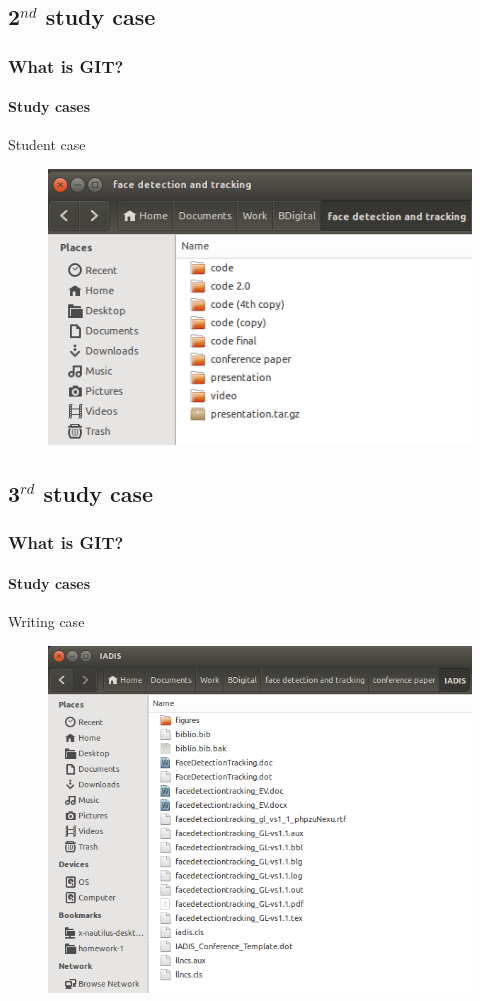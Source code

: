 \documentclass{beamer}
\begin{document}
\subsection{2$^{nd}$ study case}

\begin{frame}
  \frametitle{What is GIT?}
  \framesubtitle{Study cases}
  \begin{block}{Student case}
    \begin{figure}
      \centering
      \includegraphics[width=.7\textwidth]{./images/coding.png}
    \end{figure}
  \end{block}
\end{frame}

\subsection{3$^{rd}$ study case}

\begin{frame}
  \frametitle{What is GIT?}
  \framesubtitle{Study cases}
  \begin{block}{Writing case}
    \begin{figure}
      \centering
      \includegraphics[width=.5\textwidth]{./images/writing.png}
    \end{figure}
  \end{block}
\end{frame}
\end{document}
